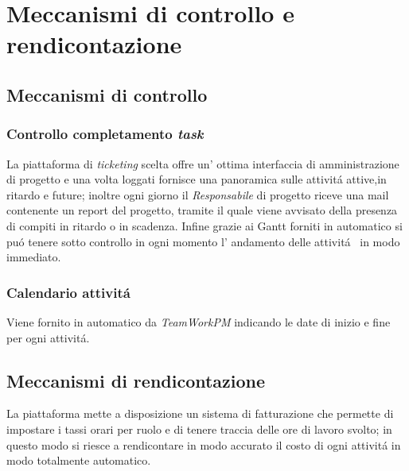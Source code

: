 \section{Meccanismi di controllo e rendicontazione}
\subsection{Meccanismi di controllo}
\subsubsection{Controllo completamento \textit{task}}
La piattaforma di \textit{ticketing} scelta offre un' ottima interfaccia di amministrazione di progetto e una volta loggati fornisce una panoramica sulle attivit\'a attive,in ritardo e future; inoltre ogni giorno il \textit{Responsabile} di progetto riceve una mail contenente un report del progetto, tramite il quale viene avvisato della presenza di compiti in ritardo o in scadenza. Infine grazie ai Gantt forniti in automatico si pu\'o tenere sotto controllo in ogni momento l' andamento delle attivit\'a~ in modo immediato.
\subsubsection{Calendario attivit\'a}
Viene fornito in automatico da \textit{TeamWorkPM} indicando le date di inizio e fine per ogni attivit\'a.
\subsection{Meccanismi di rendicontazione}
La piattaforma mette a disposizione un sistema di fatturazione che permette di impostare i tassi orari per ruolo e di tenere traccia delle ore di lavoro svolto; in questo modo si riesce a rendicontare in modo accurato il costo di ogni attivit\'a in modo totalmente automatico.